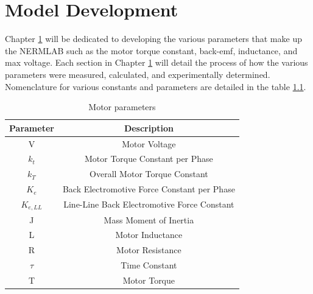 
\cleardoublepage


\chapter{Model Development}
\label{chp3}

Chapter \ref{chp3} will be dedicated to developing the various parameters that make up the NERMLAB such as the motor torque constant, \ac{back-emf}, inductance, and max voltage. Each section in Chapter \ref{chp3} will detail the process of how the various parameters were measured, calculated, and experimentally determined. Nomenclature for various constants and parameters are detailed in the table \ref{table2}.

\begin{table}[ht]
\begin{center}
\caption{Motor parameters}
\begin{tabular}[c]{|c|c|}

\hline
\textbf{Parameter} & \textbf{Description}\\

\hline
V & Motor Voltage\\

\hline
\(k_t\) & Motor Torque Constant per Phase\\

\hline
\(k_T\) & Overall Motor Torque Constant\\

\hline
\(K_e\) & Back Electromotive Force Constant per Phase\\

\hline
\(K_{e,LL}\) & Line-Line Back Electromotive Force Constant\\

\hline
J & Mass Moment of Inertia\\

\hline
L & Motor Inductance\\

\hline
R & Motor Resistance\\

\hline
\(\tau\) & Time Constant\\

\hline
T & Motor Torque\\

\hline
\end{tabular}

\label{table2}
\end{center}
\end{table}


